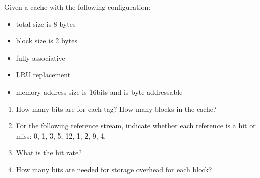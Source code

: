 \begin{problem}
  Given a cache with the following configuration:
  \begin{itemize}
    \item total size is 8 bytes
    \item block size is 2 bytes
    \item fully associative
    \item LRU replacement
    \item memory address size is 16bits and is byte addressable
  \end{itemize}
  \begin{enumerate}
    \item How many bits are for each tag? How many blocks in the cache?
    \item For the following reference stream, indicate whether each reference is a hit or miss: 0, 1, 3, 5, 12, 1, 2, 9, 4.
    \item What is the hit rate?
    \item How many bits are needed for storage overhead for each block?
  \end{enumerate}
\end{problem}
